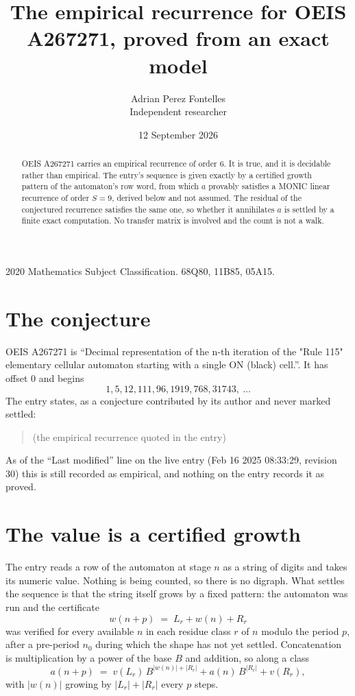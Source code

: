 \documentclass[11pt,a4paper]{article}
\title{The empirical recurrence for OEIS A267271, proved from an exact model}
\author{Adrian Perez Fontelles\\ \small Independent researcher}
\date{12 September 2026}
\theoremstyle{plain}
\theoremstyle{definition}
\begin{document}
\maketitle

\begin{abstract}
OEIS A267271 carries an empirical recurrence of order $6$. It is true, and it is
decidable rather than empirical. The entry's sequence is given exactly by a certified growth pattern of the automaton's row word, from
which $a$ provably satisfies a MONIC linear recurrence of order $S=9$, derived below and not
assumed. The residual of the conjectured recurrence satisfies the same one, so whether it
annihilates $a$ is settled by a finite exact computation. No transfer matrix is involved and
the count is not a walk.
\end{abstract}

\noindent\small 2020 Mathematics Subject Classification. 68Q80, 11B85, 05A15.\normalsize

\section{The conjecture}

OEIS A267271 is ``Decimal representation of the n-th iteration of the "Rule 115" elementary cellular automaton starting with a single ON (black) cell.''. It has offset $0$ and begins
\[
1, 5, 12, 111, 96, 1919, 768, 31743,\ \dots
\]
The entry states, as a conjecture contributed by its author and never marked settled:
\begin{quote}
(the empirical recurrence quoted in the entry)
\end{quote}
As of the ``Last modified'' line on the live entry (Feb 16 2025 08:33:29, revision 30)
this is still recorded as empirical, and nothing on the entry records it as proved.

\section{The value is a certified growth}

The entry reads a row of the automaton at stage $n$ as a string of digits and takes its
numeric value. Nothing is being counted, so there is no digraph. What settles the sequence is
that the string itself grows by a fixed pattern: the automaton was run and the certificate
\[
w(n+p)\;=\;L_r + w(n) + R_r
\]
was verified for every available $n$ in each residue class $r$ of $n$ modulo the period $p$,
after a pre-period $n_0$ during which the shape has not yet settled. Concatenation is
multiplication by a power of the base $B$ and addition, so along a class
\[
a(n+p)\;=\;v(L_r)\,B^{|w(n)|+|R_r|} + a(n)\,B^{|R_r|} + v(R_r),
\]
with $|w(n)|$ growing by $|L_r|+|R_r|$ every $p$ steps.
\end{document}
